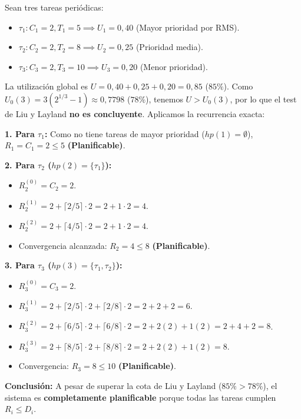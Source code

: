 \begin{ejemplo}
Sean tres tareas periódicas:
\begin{itemize}
    \item $\tau_1: C_1 = 2, T_1 = 5 \implies U_1 = 0{,}40$ (Mayor prioridad por RMS).
    \item $\tau_2: C_2 = 2, T_2 = 8 \implies U_2 = 0{,}25$ (Prioridad media).
    \item $\tau_3: C_3 = 2, T_3 = 10 \implies U_3 = 0{,}20$ (Menor prioridad).
\end{itemize}
La utilización global es $U = 0{,}40 + 0{,}25 + 0{,}20 = 0{,}85$ ($85\%$).
Como $U_0(3) = 3(2^{1/3} - 1) \approx 0{,}7798$ ($78\%$), tenemos $U > U_0(3)$, por lo que el test de Liu y Layland \textbf{no es concluyente}. Aplicamos la recurrencia exacta:

\textbf{1. Para $\tau_1$:}
Como no tiene tareas de mayor prioridad ($hp(1) = \emptyset$), $R_1 = C_1 = 2 \le 5$ \textbf{(Planificable)}.

\textbf{2. Para $\tau_2$ ($hp(2) = \{\tau_1\}$):}
\begin{itemize}
    \item $R_2^{(0)} = C_2 = 2$.
    \item $R_2^{(1)} = 2 + \lceil 2 / 5 \rceil \cdot 2 = 2 + 1 \cdot 2 = 4$.
    \item $R_2^{(2)} = 2 + \lceil 4 / 5 \rceil \cdot 2 = 2 + 1 \cdot 2 = 4$.
    \item Convergencia alcanzada: $R_2 = 4 \le 8$ \textbf{(Planificable)}.
\end{itemize}

\textbf{3. Para $\tau_3$ ($hp(3) = \{\tau_1, \tau_2\}$):}
\begin{itemize}
    \item $R_3^{(0)} = C_3 = 2$.
    \item $R_3^{(1)} = 2 + \lceil 2 / 5 \rceil \cdot 2 + \lceil 2 / 8 \rceil \cdot 2 = 2 + 2 + 2 = 6$.
    \item $R_3^{(2)} = 2 + \lceil 6 / 5 \rceil \cdot 2 + \lceil 6 / 8 \rceil \cdot 2 = 2 + 2(2) + 1(2) = 2 + 4 + 2 = 8$.
    \item $R_3^{(3)} = 2 + \lceil 8 / 5 \rceil \cdot 2 + \lceil 8 / 8 \rceil \cdot 2 = 2 + 2(2) + 1(2) = 8$.
    \item Convergencia: $R_3 = 8 \le 10$ \textbf{(Planificable)}.
\end{itemize}
\textbf{Conclusión:} A pesar de superar la cota de Liu y Layland ($85\% > 78\%$), el sistema es \textbf{completamente planificable} porque todas las tareas cumplen $R_i \le D_i$.
\end{ejemplo}

